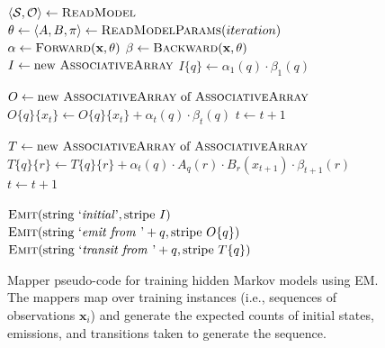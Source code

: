 \begin{figure}[p]
\algrenewcommand{}
\algrenewcommand{}
  \begin{algorithmic}[1]
    \State $\langle \mathcal{S}, \mathcal{O} \rangle \gets \textsc{ReadModel}$
    \State $\theta \gets \langle A , B , \pi \rangle \gets \textsc{ReadModelParams}(iteration)$
    \EndProcedure
        \State $\alpha \gets \textsc{Forward}(\textbf{x},\theta)$ 
        \State $\beta \gets \textsc{Backward}(\textbf{x},\theta)$ 
        \State $I \gets \textrm{new }\textsc{AssociativeArray}$ 
           
          \State $I\{q\} \gets \alpha_1(q) \cdot \beta_1(q)$
        \EndFor
        
        \State $O \gets \textrm{new }\textsc{AssociativeArray}\textrm{ of }\textsc{AssociativeArray}$ 
          
           
           \State $O\{q\}\{x_t\} \gets O\{q\}\{x_t\} + \alpha_t(q) \cdot \beta_t(q)$
        \EndFor
           \State $t \leftarrow t + 1$
        \EndFor

        \State $T \gets \textrm{new }\textsc{AssociativeArray}\textrm{ of }\textsc{AssociativeArray}$
          
           
           
           \State $T\{q\}\{r\} \gets T\{q\}\{r\} + \alpha_t(q) \cdot A_q(r) \cdot B_r(x_{t+1}) \cdot \beta_{t+1}(r)$
        \EndFor
        \EndFor
        \State $t \leftarrow t + 1$
        \EndFor

        \State $\textsc{Emit}(\textrm{string `\emph{initial}'}, \textrm{stripe }I)$
           
           \State $\textsc{Emit}(\textrm{string `\emph{emit from }'}+q, \textrm{stripe }O\{q\})$
           \State $\textsc{Emit}(\textrm{string `\emph{transit from }'}+q, \textrm{stripe }T\{q\})$
        \EndFor

    \EndProcedure
    \EndFunction
  \end{algorithmic}
  \caption{Mapper pseudo-code for training hidden Markov models using EM.  The mappers map over training instances (i.e., sequences of observations $\textbf{x}_i$) and generate the expected counts of initial states, emissions, and transitions taken to generate the sequence.}
\label{figure:chapter6:mr_hmm_mapper}
\end{figure}

